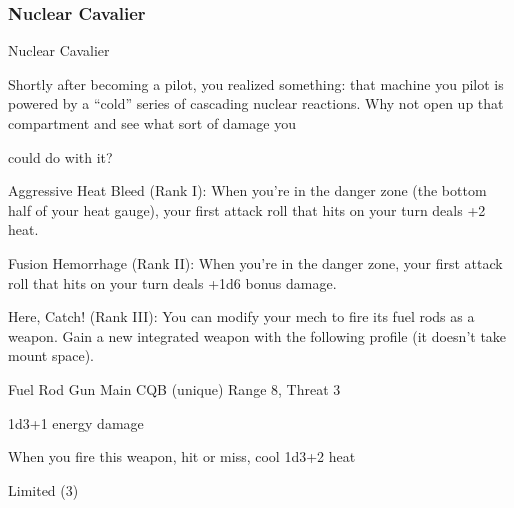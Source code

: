 \subsubsection{Nuclear Cavalier}

                                             Nuclear Cavalier

Shortly after becoming a pilot, you realized something: that machine you pilot is powered by a ``cold'' series
of cascading nuclear reactions. Why not open up that compartment and see what sort of damage you

could do with it?

Aggressive Heat Bleed  (Rank I): When you’re in the danger zone (the bottom half of your heat
gauge), your first attack roll that hits on your turn deals +2 heat.

Fusion Hemorrhage (Rank II): When you’re in the danger zone, your first attack roll that hits on
your turn deals +1d6 bonus damage.

Here, Catch! (Rank III): You can modify your mech to fire its fuel rods as a weapon. Gain a new
integrated weapon with the following profile (it doesn’t take mount space).

         Fuel Rod Gun
         Main CQB (unique)
         Range 8, Threat 3

         1d3+1 energy damage

         When you fire this weapon, hit or miss, cool 1d3+2 heat

         Limited (3)
